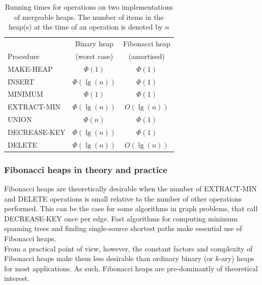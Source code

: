 \begin{footnotesize}
\begin{table}[H]
\center
\begin{tabular}{l c c}
 & Binary heap & Fibonacci heap \\
 Procedure & (worst case) & (amortised)\\
\hline
MAKE-HEAP 		& $\Phi(1)$ 		& $\Phi(1)$\\
INSERT 			& $\Phi(\lg(n))$ 	& $\Phi(1)$\\
MINIMUM			& $\Phi(1)$		& $\Phi(1)$\\
EXTRACT-MIN		& $\Phi(\lg(n))$	& $O(\lg(n))$\\
UNION			& $\Phi(n)$		& $\Phi(1)$\\
DECREASE-KEY	& $\Phi(\lg(n))$	& $\Phi(1)$\\
DELETE			& $\Phi(\lg(n))$	& $O(\lg(n))$
\end{tabular}
\caption{Running times for operations on two implementations of mergeable heaps. The number of items in the heap(s) at the time of an operation is denoted by $n$}
\end{table}
\end{footnotesize}
%
\subsubsection{Fibonacci heaps in theory and practice}
Fibonacci heaps are theoretically desirable when the number of EXTRACT-MIN and DELETE operations is small relative to the number of other operations performed. This can be the case for some algorithms in graph problems, that call DECREASE-KEY once per edge. Fast algorithms for computing minimum spanning trees and finding single-source shortest paths make essential use of Fibonacci heaps.\\

From a practical point of view, however, the constant factors and complexity of Fibonacci heaps make them less desirable than ordinary binary (or $k$-ary) heaps for most applications. As such, Fibonacci heaps are pre-dominantly of theoretical interest.
%
